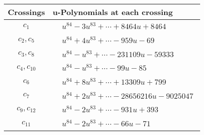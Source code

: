 \documentclass[1p]{elsarticle_modified}
\theoremstyle{definition}
\begin{document}
\begin{tabular}{m{50pt}|m{274pt}}
Crossings & \hspace{64pt}u-Polynomials at each crossing \\
\hline $$\begin{aligned}c_{1}\end{aligned}$$&$\begin{aligned}
&u^{84}-3 u^{83}+\cdots+8464 u+8464
\end{aligned}$\\
\hline $$\begin{aligned}c_{2},c_{5}\end{aligned}$$&$\begin{aligned}
&u^{84}+4 u^{83}+\cdots-959 u-69
\end{aligned}$\\
\hline $$\begin{aligned}c_{3},c_{8}\end{aligned}$$&$\begin{aligned}
&u^{84}- u^{83}+\cdots-231109 u-59333
\end{aligned}$\\
\hline $$\begin{aligned}c_{4},c_{10}\end{aligned}$$&$\begin{aligned}
&u^{84}- u^{83}+\cdots-99 u-85
\end{aligned}$\\
\hline $$\begin{aligned}c_{6}\end{aligned}$$&$\begin{aligned}
&u^{84}+8 u^{83}+\cdots+13309 u+799
\end{aligned}$\\
\hline $$\begin{aligned}c_{7}\end{aligned}$$&$\begin{aligned}
&u^{84}+2 u^{83}+\cdots-28656216 u-9025047
\end{aligned}$\\
\hline $$\begin{aligned}c_{9},c_{12}\end{aligned}$$&$\begin{aligned}
&u^{84}-2 u^{83}+\cdots-931 u+393
\end{aligned}$\\
\hline $$\begin{aligned}c_{11}\end{aligned}$$&$\begin{aligned}
&u^{84}-2 u^{83}+\cdots-66 u-71
\end{aligned}$\\
\hline
\end{tabular}\\~\\
\end{document}
